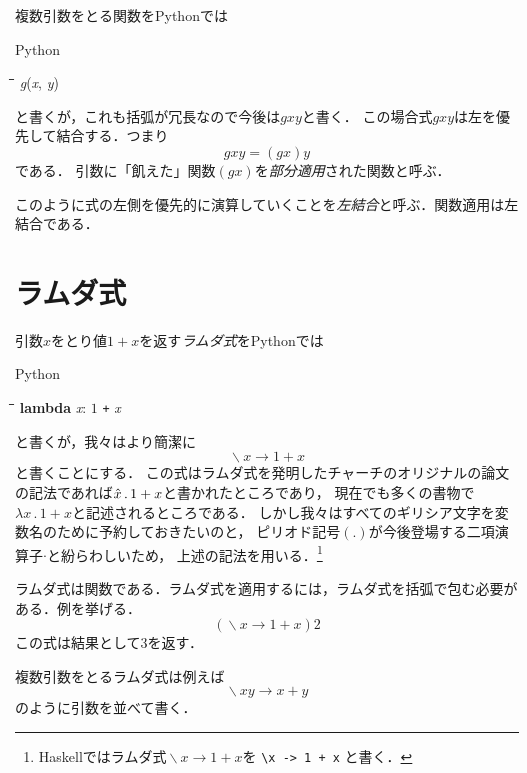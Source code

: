 \documentclass[twocolumn]{jsbook}
\newcommand{\programminglanguage}[1]{\textsf{#1}}
\newcommand{\haskell}{\programminglanguage{Haskell}}
\newcommand{\python}{\programminglanguage{Python}}
\newcommand{\code}[1]{\texttt{#1}}
\newcommand{\keyword}[1]{{\emph{#1}}}
\newenvironment{pythoncode}{\begin{itembox}[r]{\python}}{\end{itembox}}
\newenvironment{pythontab}{\begin{tabbing}\hspace*{1em}\=\hspace*{1em}\=\hspace*{1em}\=\hspace*{1em}\=\kill}{\end{tabbing}}
\newcommand{\pthnId}[1]{\textit{#1}}
\newcommand{\pthnKeyword}[1]{\textbf{#1}}
\newcommand{\pthnOp}[1]{\texttt{#1}}
\DeclareMathOperator{\mathLambda}{\backslash}
\newcommand{\mathLambdaArrow}{\rightarrow}
\newcommand{\mathLambdaExpression}[2]{\mathLambda#1\mathLambdaArrow#2}
\begin{document}
複数引数をとる関数を\python では
\begin{pythoncode}
\begin{pythontab}
\pthnId{g}(\pthnId{x}, \pthnId{y})
\end{pythontab}
\end{pythoncode}
と書くが，これも括弧が冗長なので今後は$gxy$と書く．
この場合式$gxy$は左を優先して結合する．つまり
\begin{equation}
gxy=\left(gx\right)y
\end{equation}
である．
引数に「飢えた」関数$\left(gx\right)$を\keyword{部分適用}された関数と呼ぶ．

このように式の左側を優先的に演算していくことを\keyword{左結合}と呼ぶ．関数適用は左結合である．

\section{ラムダ式}

引数$x$をとり値$1+x$を返す\keyword{ラムダ式}を\python では
\begin{pythoncode}
\begin{pythontab}
\pthnKeyword{lambda} \pthnId{x}: $1$ \pthnOp{+} \pthnId{x}
\end{pythontab}
\end{pythoncode}
と書くが，我々はより簡潔に
\begin{equation*}
\mathLambdaExpression{x}{1+x}
\end{equation*}
と書くことにする．
この式はラムダ式を発明したチャーチのオリジナルの論文の記法であれば$\Hat x\,.\,1+x$と書かれたところであり，
現在でも多くの書物で$\lambda x\,.\,1+x$と記述されるところである．
しかし我々はすべてのギリシア文字を変数名のために予約しておきたいのと，
ピリオド記号$\left(.\right)$が今後登場する二項演算子$\cdot$と紛らわしいため，
上述の記法を用いる．\footnote{\haskell ではラムダ式$\mathLambdaExpression{x}{1+x}$を \code{\textbackslash x -> 1 + x} と書く．}

ラムダ式は関数である．ラムダ式を適用するには，ラムダ式を括弧で包む必要がある．例を挙げる．
\begin{equation*}
\left(\mathLambdaExpression{x}{1+x}\right)2
\end{equation*}
この式は結果として$3$を返す．

複数引数をとるラムダ式は例えば
\begin{equation*}
\mathLambdaExpression{xy}{x+y}
\end{equation*}
のように引数を並べて書く．
\end{document}
